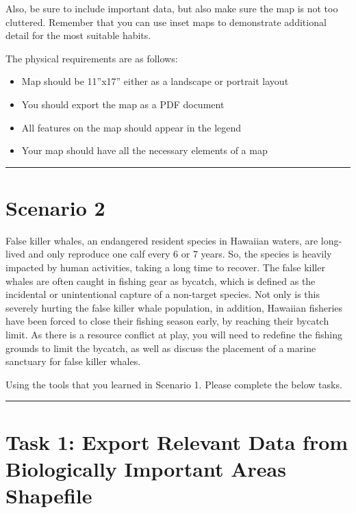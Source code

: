 \documentclass[
]{book}
\providecommand{\tightlist}{%
  \setlength{\itemsep}{0pt}\setlength{\parskip}{0pt}}
\begin{document}
Also, be sure to include important data, but also make sure the map is not too cluttered. Remember that you can use inset maps to demonstrate additional detail for the most suitable habits.

The physical requirements are as follows:

\begin{itemize}
\tightlist
\item
  Map should be 11''x17'' either as a landscape or portrait layout
\item
  You should export the map as a PDF document
\item
  All features on the map should appear in the legend
\item
  Your map should have all the necessary elements of a map
\end{itemize}

\begin{center}\rule{0.5\linewidth}{0.5pt}\end{center}

\hypertarget{scenario-2}{%
\section*{Scenario 2}\label{scenario-2}}

False killer whales, an endangered resident species in Hawaiian waters, are long-lived and only reproduce one calf every 6 or 7 years. So, the species is heavily impacted by human activities, taking a long time to recover. The false killer whales are often caught in fishing gear as bycatch, which is defined as the incidental or unintentional capture of a non-target species. Not only is this severely hurting the false killer whale population, in addition, Hawaiian fisheries have been forced to close their fishing season early, by reaching their bycatch limit. As there is a resource conflict at play, you will need to redefine the fishing grounds to limit the bycatch, as well as discuss the placement of a marine sanctuary for false killer whales.

Using the tools that you learned in Scenario 1. Please complete the below tasks.

\begin{center}\rule{0.5\linewidth}{0.5pt}\end{center}

\hypertarget{task-1-export-relevant-data-from-biologically-important-areas-shapefile-1}{%
\section*{Task 1: Export Relevant Data from Biologically Important Areas Shapefile}\label{task-1-export-relevant-data-from-biologically-important-areas-shapefile-1}}
\end{document}
